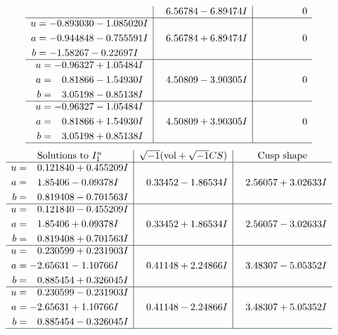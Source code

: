 \documentclass[1p]{elsarticle_modified}
\theoremstyle{definition}
\newcommand{\I}{\sqrt{-1}}
\begin{document}
$$\begin{array}{c|c|c}
 & \phantom{-}6.56784 - 6.89474 I & \phantom{-0.000000 } 0 \\ \hline\begin{aligned}
u &= -0.893030 - 1.085020 I \\
a &= -0.944848 - 0.755591 I \\
b &= -1.58267 - 0.22697 I\end{aligned}
 & \phantom{-}6.56784 + 6.89474 I & \phantom{-0.000000 } 0 \\ \hline\begin{aligned}
u &= -0.96327 + 1.05484 I \\
a &= \phantom{-}0.81866 - 1.54930 I \\
b &= \phantom{-}3.05198 - 0.85138 I\end{aligned}
 & \phantom{-}4.50809 - 3.90305 I & \phantom{-0.000000 } 0 \\ \hline\begin{aligned}
u &= -0.96327 - 1.05484 I \\
a &= \phantom{-}0.81866 + 1.54930 I \\
b &= \phantom{-}3.05198 + 0.85138 I\end{aligned}
 & \phantom{-}4.50809 + 3.90305 I & \phantom{-0.000000 } 0\\
 \hline 
 \end{array}$$\newpage$$\begin{array}{c|c|c}  
\text{Solutions to }I^u_{1}& \I (\text{vol} + \sqrt{-1}CS) & \text{Cusp shape}\\
 \hline 
\begin{aligned}
u &= \phantom{-}0.121840 + 0.455209 I \\
a &= \phantom{-}1.85406 - 0.09378 I \\
b &= \phantom{-}0.819408 - 0.701563 I\end{aligned}
 & \phantom{-}0.33452 - 1.86534 I & \phantom{-}2.56057 + 3.02633 I \\ \hline\begin{aligned}
u &= \phantom{-}0.121840 - 0.455209 I \\
a &= \phantom{-}1.85406 + 0.09378 I \\
b &= \phantom{-}0.819408 + 0.701563 I\end{aligned}
 & \phantom{-}0.33452 + 1.86534 I & \phantom{-}2.56057 - 3.02633 I \\ \hline\begin{aligned}
u &= \phantom{-}0.230599 + 0.231903 I \\
a &= -2.65631 - 1.10766 I \\
b &= \phantom{-}0.885454 + 0.326045 I\end{aligned}
 & \phantom{-}0.41148 + 2.24866 I & \phantom{-}3.48307 - 5.05352 I \\ \hline\begin{aligned}
u &= \phantom{-}0.230599 - 0.231903 I \\
a &= -2.65631 + 1.10766 I \\
b &= \phantom{-}0.885454 - 0.326045 I\end{aligned}
 & \phantom{-}0.41148 - 2.24866 I & \phantom{-}3.48307 + 5.05352 I\\
 \hline 
 \end{array}$$\newpage\newpage\renewcommand{\arraystretch}{1}
\end{document}
